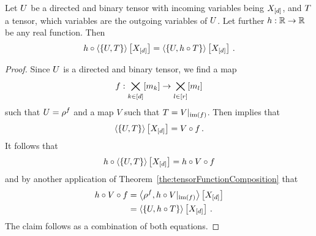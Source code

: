 \begin{corollary}\label{cor:directedTrafo}
	Let $U$ be a directed and binary tensor with incoming variables being $X_{[d]}$, and $T$ a tensor, which variables are the outgoing variables of $U$.
	Let further $h:\mathbb{R}\rightarrow\mathbb{R}$ be any real function.
	Then
		\[ h \circ \left\langle \{U,T\}\right\rangle \left[ X_{[d]} \right] 
		= \left\langle \{U,h\circ T\}\right\rangle \left[ X_{[d]} \right] \, . \]
\end{corollary}
\begin{proof}
	Since $U$ is a directed and binary tensor, we find a map
		\[ f : \bigtimes_{k\in[d]}[m_{k}] \rightarrow \bigtimes_{l\in[r]}[m_{l}] \]
	such that $U=\rho^{f}$ and a map $V$ such that $T={V}|_{\mathrm{im}\left(f\right)}$.
	Then  implies that
		\[ \left\langle \{U,T\}\right\rangle \left[ X_{[d]} \right] = V \circ f \, . \]
	It follows that 
	\begin{align*}
		h \circ \left\langle \{U,T\}\right\rangle \left[ X_{[d]} \right] = h \circ V \circ f 
	\end{align*}
	and by another application of Theorem~\ref{the:tensorFunctionComposition} that
	\begin{align*}
		h \circ V \circ f
		& = \left\langle \rho^{f}, {h \circ V}|_{\mathrm{im}\left(f\right)}\right\rangle \left[ X_{[d]} \right] \\
		& = \left\langle \{U,h\circ T\}\right\rangle \left[ X_{[d]} \right] \, . 
	\end{align*}
	The claim follows as a combination of both equations.
\end{proof}



